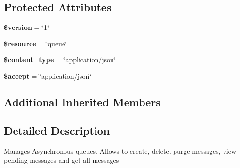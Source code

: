 \subsection*{Protected Attributes}
\begin{DoxyCompactItemize}
\item 
\hypertarget{class_queue_service_a17c8948c68aa44fa9961ae169b6a8961}{{\bfseries \$version} = \char`\"{}1.\char`\"{}}\label{class_queue_service_a17c8948c68aa44fa9961ae169b6a8961}

\item 
\hypertarget{class_queue_service_abd4c7b8b084214b8d2533ba07fce6b83}{{\bfseries \$resource} = \char`\"{}queue\char`\"{}}\label{class_queue_service_abd4c7b8b084214b8d2533ba07fce6b83}

\item 
\hypertarget{class_queue_service_ae754d6373f275e781f47c8bc9b994b6d}{{\bfseries \$content\+\_\+type} = \char`\"{}application/json\char`\"{}}\label{class_queue_service_ae754d6373f275e781f47c8bc9b994b6d}

\item 
\hypertarget{class_queue_service_a75fc18c4ff06288ff9fdf8aba9bd1081}{{\bfseries \$accept} = \char`\"{}application/json\char`\"{}}\label{class_queue_service_a75fc18c4ff06288ff9fdf8aba9bd1081}

\end{DoxyCompactItemize}
\subsection*{Additional Inherited Members}


\subsection{Detailed Description}
Manages Asynchronous queues. Allows to create, delete, purge messages, view pending messages and get all messages 

